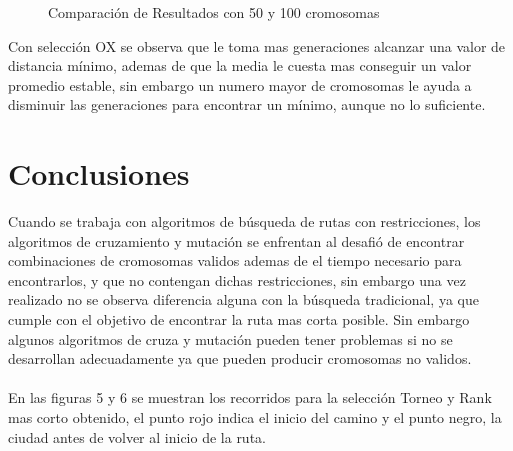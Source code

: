 \documentclass[10pt,letterpaper]{article}
\begin{document}
\begin{figure}[H]
      \begin{center}
        \caption{Comparación de Resultados con 50 y 100 cromosomas}
        \label{Patron de señales para reconocimiento de señal Gaussiana}
      \end{center}
    \end{figure}

Con selección OX se observa que le toma mas generaciones alcanzar una valor de distancia mínimo, ademas de que la media le cuesta mas conseguir un valor promedio estable, sin embargo un numero mayor de cromosomas le ayuda a disminuir las generaciones para encontrar un mínimo, aunque no lo suficiente.

\section{Conclusiones}
Cuando se trabaja con algoritmos de búsqueda de rutas con restricciones, los algoritmos de cruzamiento y mutación se enfrentan al desafió de encontrar combinaciones de cromosomas validos ademas de el tiempo necesario para encontrarlos, y que no contengan dichas restricciones, sin embargo una vez realizado no se observa diferencia alguna con la búsqueda tradicional, ya que cumple con el objetivo de encontrar la ruta mas corta posible. Sin embargo algunos algoritmos de cruza y mutación pueden tener problemas si no se desarrollan adecuadamente ya que pueden producir cromosomas no validos.
\\\\
En las figuras 5 y  6 se muestran los recorridos para la selección Torneo y Rank mas corto obtenido, el punto rojo indica el inicio del camino y el punto negro, la ciudad antes de volver al inicio de la ruta.
\end{document}
